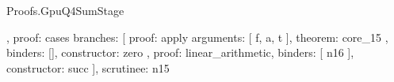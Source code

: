 \begin{lexlean}{Proofs.GpuQ4SumStage}
\begin{semanticmodule}
{{{{{{{{{{{{{{{{{{{{{{{{{{{{{{{                                                                                          },
                                                                                          {
                                                                                            proof: cases{
                                                                                              branches: [
                                                                                                {
                                                                                                  proof: apply{
                                                                                                    arguments: [
                                                                                                      f,
                                                                                                      a,
                                                                                                      t
                                                                                                    ],
                                                                                                    theorem: core_15
                                                                                                  },
                                                                                                  binders: [],
                                                                                                  constructor: zero
                                                                                                },
                                                                                                {
                                                                                                  proof: linear_arithmetic{},
                                                                                                  binders: [
                                                                                                    n16
                                                                                                  ],
                                                                                                  constructor: succ
                                                                                                }
                                                                                              ],
                                                                                              scrutinee: n15
}}}}}}}}}}}}}}}}}}}}}}}}}}}}}}}}
\end{semanticmodule}
\end{lexlean}
